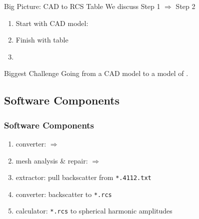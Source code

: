 \begin{frame}{Big Picture: CAD to RCS Table}
We discuss Step 1 $\Rightarrow$ Step 2
\begin{enumerate}
	\item Start with CAD model: \stl
	\item Finish with table 
	\item {}
\end{enumerate}
\end{frame}

\begin{frame}{Biggest Challenge}
Going from a CAD model to a model of .
\end{frame}

\subsection{Software Components}
\begin{frame}\frametitle{Software Components}
\begin{enumerate}
	\item converter: \obj $\Rightarrow$ \facet
	\item mesh analysis \& repair: \obj $\Rightarrow$ \facet
	\item extractor: pull backscatter from \texttt{*.4112.txt}
	\item converter: backscatter to \texttt{*.rcs}
	\item calculator: \texttt{*.rcs} to spherical harmonic amplitudes
\end{enumerate}
\end{frame}

\endinput  %
